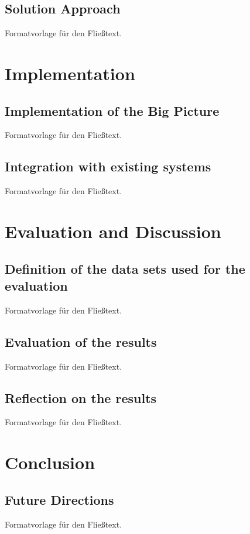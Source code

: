 \documentclass[a4paper,12pt,twoside]{scrreprt}
\begin{document}
\section{Solution Approach}
Formatvorlage für den Fließtext.


\chapter{Implementation}

\section{Implementation of the Big Picture}
Formatvorlage für den Fließtext.

\section{Integration with existing systems}
Formatvorlage für den Fließtext.


\chapter{Evaluation and Discussion}

\section{Definition of the data sets used for the evaluation}
Formatvorlage für den Fließtext.

\section{Evaluation of the results}
Formatvorlage für den Fließtext.

\section{Reflection on the results}
Formatvorlage für den Fließtext.


\chapter{Conclusion}

\section{Future Directions}
Formatvorlage für den Fließtext.
\end{document}
